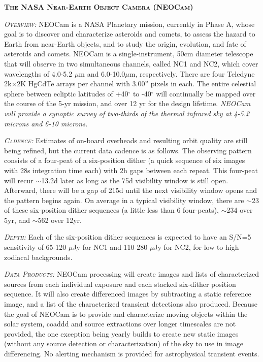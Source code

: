 \documentclass[12pt]{article}
\begin{document}
\smallskip
\smallskip
\noindent
{\bfseries \textsc{\textcolor{Cerulean}{The NASA Near-Earth Object Camera (NEOCam)}}}

\textsl{\textsc{Overview:}}
NEOCam is a NASA Planetary mission, currently in Phase A, whose goal
is to discover and characterize asteroids and comets, to assess the
hazard to Earth from near-Earth objects, and to study the origin,
evolution, and fate of asteroids and comets. NEOCam is a
single-instrument, 50cm diameter telescope that will observe in two
simultaneous channels, called NC1 and NC2, which cover wavelengths of
4.0-5.2 $\mu$m and 6.0-10.0$\mu$m, respectively. There are four Teledyne
2k$\times$2K HgCdTe arrays per channel with 3.00'' pixels in each. The entire
celestial sphere between ecliptic latitudes of +40$^{\circ}$ to -40$^{\circ}$ will
continually be mapped over the course of the 5-yr mission, and over 12
yr for the design lifetime. 
{\it NEOCam will provide a synoptic survey of two-thirds of the thermal infrared sky at 4-5.2 microns and 6-10 microns.}

\smallskip
\smallskip
\noindent
\textsl{\textsc{Cadence:}} Estimates of on-board overheads and resulting orbit quality are still being refined, but the current data cadence is as follows. The observing pattern consists of a four-peat of a six-position dither (a quick sequence of six images with 28s integration time each) with 2h gaps between each repeat. This four-peat will recur $\sim$13.2d later as long as the 75d visibility window is still open. Afterward, there will be a gap of 215d until the next visibility window opens and the pattern begins again. On average in a typical visibility window, there are $\sim$23 of these six-position dither sequences (a little less than 6 four-peats), $\sim$234 over 5yr, and $\sim$562 over 12yr.

\smallskip
\smallskip
\noindent
\textsl{\textsc{Depth:}} Each of the six-position dither sequences is expected to have an S/N=5 sensitivity of 65-120 $\mu$Jy for NC1 and 110-280 $\mu$Jy for NC2, for low to high zodiacal backgrounds. 

\smallskip
\smallskip
\noindent
\textsl{\textsc{Data Products:}} NEOCam processing will create images and lists of characterized sources from each individual exposure and each stacked six-dither position sequence. It will also create differenced images by subtracting a static reference image, and a list of the characterized transient detections also produced. Because the goal of NEOCam is to provide and characterize moving objects within the solar system, coaddd and source extractions over longer timescales are not provided, the one exception being yearly builds to create new static images (without any source detection or characterization) of the sky to use in image differencing. No alerting mechanism is provided for astrophysical transient events.  
\end{document}

